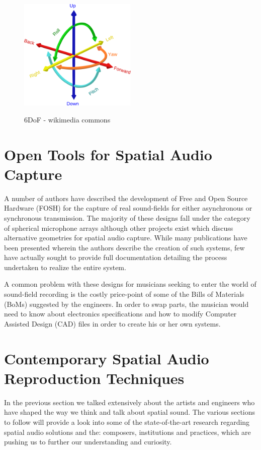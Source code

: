 \begin{figure}[h!]%
\centering
\includegraphics[width=0.5\textwidth]{img/6DOF.svg.png} 
\label{fig:6DoF}
\caption{6DoF - wikimedia commons}
\end{figure}

\section{Open Tools for Spatial Audio Capture}

A number of authors have described the development of Free and Open Source Hardware (FOSH) for the capture of real sound-fields for either asynchronous or synchronous transmission. The majority of these designs fall under the category of spherical microphone arrays although other projects exist which discuss alternative geometries for spatial audio capture. While many publications have been presented wherein the authors describe the creation of such systems, few have actually sought to provide full documentation detailing the process undertaken to realize the entire system. 

A common problem with these designs for musicians seeking to enter the world of sound-field recording is the costly price-point of some of the Bills of Materials (BoMs) suggested by the engineers. In order to swap parts, the musician would need to know about electronics specifications and how to modify Computer Assisted Design (CAD) files in order to create his or her own systems.

\section{Contemporary Spatial Audio Reproduction Techniques} \label{sec:contemp_audio_reproduction}

In the previous section we talked extensively about the artists and engineers who have shaped the way we think and talk about spatial sound. The various sections to follow will provide a look into some of the state-of-the-art research regarding spatial audio solutions and the: composers, institutions and practices, which are pushing us to further our understanding and curiosity. 

